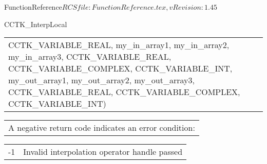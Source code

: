 \begin{cactuspart}{5}{FunctionReference}{$RCSfile: FunctionReference.tex,v $}{$Revision: 1.45 $}
\begin{CCTKFunc}{CCTK\_InterpLocal}
\begin{examples}
\begin{tabular}{@{}p{3cm}cp{11cm}}
{\hspace{2ex} CCTK\_VARIABLE\_REAL,\vfill
\hspace{2ex} my\_in\_array1, my\_in\_array2, my\_in\_array3,\vfill
\hspace{2ex} CCTK\_VARIABLE\_REAL, CCTK\_VARIABLE\_COMPLEX,\vfill
\hspace{2ex} CCTK\_VARIABLE\_INT,\vfill
\hspace{2ex} my\_out\_array1, my\_out\_array2, my\_out\_array3,\vfill
\hspace{2ex} CCTK\_VARIABLE\_REAL, CCTK\_VARIABLE\_COMPLEX,\vfill
\hspace{2ex} CCTK\_VARIABLE\_INT)
}
\\
\end{tabular}
\end{examples}
\begin{errorcodes}
\begin{tabular}{l}
A negative return code indicates an error condition:
\end{tabular}
\begin{tabular}{ll}
-1 & Invalid interpolation operator handle passed\\
\end{tabular}
\end{errorcodes}
\end{CCTKFunc}



\end{cactuspart}
